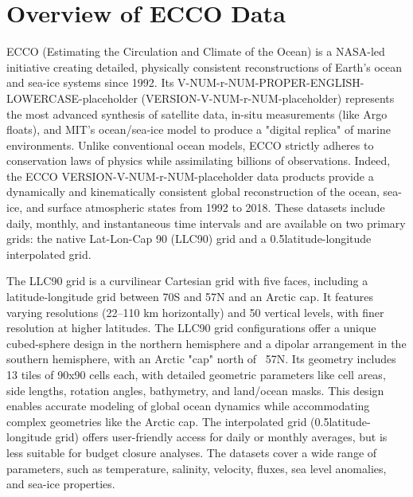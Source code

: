 \pagebreak
\section{Overview of ECCO Data}

\par\vspace{0.25cm}
ECCO (Estimating the Circulation and Climate of the Ocean) is a NASA-led initiative creating detailed, physically consistent reconstructions of Earth's ocean and sea-ice systems since 1992. Its V-NUM-r-NUM-PROPER-ENGLISH-LOWERCASE-placeholder (VERSION-V-NUM-r-NUM-placeholder) represents the most advanced synthesis of satellite data, in-situ measurements (like Argo floats), and MIT's ocean/sea-ice model to produce a "digital replica" of marine environments. Unlike conventional ocean models, ECCO strictly adheres to conservation laws of physics while assimilating billions of observations. Indeed, the ECCO VERSION-V-NUM-r-NUM-placeholder data products provide a dynamically and kinematically consistent global reconstruction of the ocean, sea-ice, and surface atmospheric states from 1992 to 2018. These datasets include daily, monthly, and instantaneous time intervals and are available on two primary grids: the native Lat-Lon-Cap 90 (LLC90) grid and a 0.5\textdegree latitude-longitude interpolated grid. 

\par\vspace{0.25cm}
The LLC90 grid is a curvilinear Cartesian grid with five faces, including a latitude-longitude grid between 70\textdegree S and 57\textdegree N and an Arctic cap. It features varying resolutions (22–110 km horizontally) and 50 vertical levels, with finer resolution at higher latitudes. The LLC90 grid configurations offer a unique cubed-sphere design in the northern hemisphere and a dipolar arrangement in the southern hemisphere, with an Arctic "cap" north of ~57\textdegree N. Its geometry includes 13 tiles of 90x90 cells each, with detailed geometric parameters like cell areas, side lengths, rotation angles, bathymetry, and land/ocean masks. This design enables accurate modeling of global ocean dynamics while accommodating complex geometries like the Arctic cap.
The interpolated grid (0.5\textdegree latitude-longitude grid) offers user-friendly access for daily or monthly averages, but is less suitable for budget closure analyses. The datasets cover a wide range of parameters, such as temperature, salinity, velocity, fluxes, sea level anomalies, and sea-ice properties.

